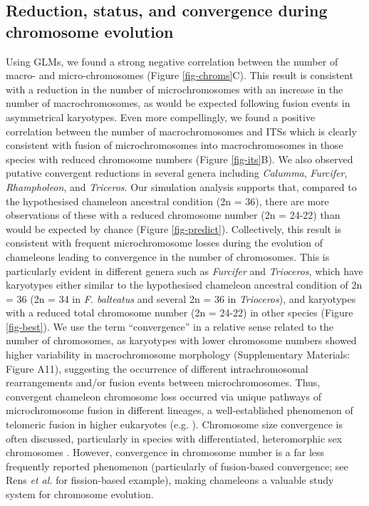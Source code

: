 \documentclass[a4paper, 12pt]{article}
\begin{document}
\subsection{Reduction, status, and convergence during chromosome evolution}
Using GLMs, we found a strong negative correlation between the number of macro- and micro-chromosomes (Figure \ref{fig-chroms}C). 
This result is consistent with a reduction in the number of microchromosomes with an increase in the number of macrochromosomes, as would be expected following fusion events in asymmetrical karyotypes. 
Even more compellingly, we found a positive correlation between the number of macrochromosomes and ITSs which is clearly consistent with fusion of microchromosomes into macrochromosomes in those species with reduced chromosome numbers (Figure \ref{fig-its}B). 
We also observed putative convergent reductions in several genera including \textit{Calumma}, \textit{Furcifer}, \textit{Rhampholeon}, and \textit{Triceros}. 
Our simulation analysis supports that, compared to the hypothesised chameleon ancestral condition (2n = 36), there are more observations of these with a reduced chromosome number (2n = 24-22) than would be expected by chance (Figure \ref{fig-predict}). 
Collectively, this result is consistent with frequent microchromosome losses during the evolution of chameleons leading to convergence in the number of chromosomes. 
This is particularly evident in different genera such as \textit{Furcifer} and \textit{Trioceros}, which have karyotypes either similar to the hypothesised chameleon ancestral condition of 2n = 36 (2n = 34 in \textit{F. balteatus} and several 2n = 36 in \textit{Trioceros}), and karyotypes with a reduced total chromosome number (2n = 24-22) in other species (Figure \ref{fig-best}). 
We use the term ``convergence'' in a relative sense related to the number of chromosomes, as karyotypes with lower chromosome numbers showed higher variability in macrochromosome morphology (Supplementary Materials: Figure A11), suggesting the occurrence of different intrachromosomal rearrangements and/or fusion events between microchromosomes. 
Thus, convergent chameleon chromosome loss occurred via unique pathways of microchromosome fusion in different lineages, a well-established phenomenon of telomeric fusion in higher eukaryotes (e.g. \citealt{heacock2004molecular}).  
Chromosome size convergence is often discussed, particularly in species with differentiated, heteromorphic sex chromosomes \citep{montiel2017discovery,kratochvil2021sex}. 
However, convergence in chromosome number is a far less frequently reported phenomenon (particularly of fusion-based convergence; see Rens \textit{et al.} \citeyear{rens2003reversal} for fission-based example), making chameleons a valuable study system for chromosome evolution. 
\end{document}
